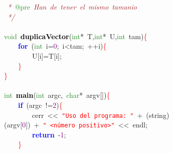 \mbox{}\textit{\textcolor{Brown}{\ *\ }}\textcolor{ForestGreen}{@pre}\textit{\textcolor{Brown}{\ Han\ de\ tener\ el\ mismo\ tamanio}} \\
\mbox{}\textit{\textcolor{Brown}{\ */}} \\
\mbox{} \\
\mbox{}\textcolor{ForestGreen}{void}\ \textbf{\textcolor{Black}{duplicaVector}}\textcolor{BrickRed}{(}\textcolor{ForestGreen}{int}\textcolor{BrickRed}{*}\ T\textcolor{BrickRed}{,}\textcolor{ForestGreen}{int}\textcolor{BrickRed}{*}\ U\textcolor{BrickRed}{,}\textcolor{ForestGreen}{int}\ tam\textcolor{BrickRed}{)}\textcolor{Red}{\{} \\
\mbox{}\ \ \ \ \textbf{\textcolor{Blue}{for}}\ \textcolor{BrickRed}{(}\textcolor{ForestGreen}{int}\ i\textcolor{BrickRed}{=}\textcolor{Purple}{0}\textcolor{BrickRed}{;}\ i\textcolor{BrickRed}{\textless{}}tam\textcolor{BrickRed}{;}\ \textcolor{BrickRed}{++}i\textcolor{BrickRed}{)}\textcolor{Red}{\{} \\
\mbox{}\ \ \ \ \ \ \ \ U\textcolor{BrickRed}{[}i\textcolor{BrickRed}{]=}T\textcolor{BrickRed}{[}i\textcolor{BrickRed}{];} \\
\mbox{}\ \ \ \ \textcolor{Red}{\}} \\
\mbox{}\textcolor{Red}{\}} \\
\mbox{} \\
\mbox{}\textcolor{ForestGreen}{int}\ \textbf{\textcolor{Black}{main}}\textcolor{BrickRed}{(}\textcolor{ForestGreen}{int}\ argc\textcolor{BrickRed}{,}\ \textcolor{ForestGreen}{char}\textcolor{BrickRed}{*}\ argv\textcolor{BrickRed}{[])}\textcolor{Red}{\{} \\
\mbox{}\ \ \ \ \textbf{\textcolor{Blue}{if}}\ \textcolor{BrickRed}{(}argc\ \textcolor{BrickRed}{!=}\textcolor{Purple}{2}\textcolor{BrickRed}{)}\textcolor{Red}{\{} \\
\mbox{}\ \ \ \ \ \ \ \ cerr\ \textcolor{BrickRed}{\textless{}\textless{}}\ \texttt{\textcolor{Red}{"{}Uso\ del\ programa:\ "{}}}\ \textcolor{BrickRed}{+}\ \textcolor{BrickRed}{(}string\textcolor{BrickRed}{)(}argv\textcolor{BrickRed}{[}\textcolor{Purple}{0}\textcolor{BrickRed}{])}\ \textcolor{BrickRed}{+}\ \texttt{\textcolor{Red}{"{}\ \textless{}número\ positivo\textgreater{}"{}}}\ \textcolor{BrickRed}{\textless{}\textless{}}\ endl\textcolor{BrickRed}{;}\ \  \\
\mbox{}\ \ \ \ \ \ \ \ \textbf{\textcolor{Blue}{return}}\ \textcolor{BrickRed}{-}\textcolor{Purple}{1}\textcolor{BrickRed}{;} \\
\mbox{}\ \ \ \ \textcolor{Red}{\}} \\
